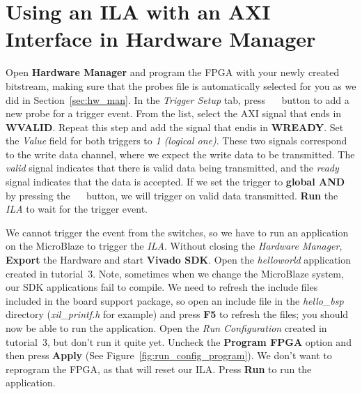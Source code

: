 \documentclass[11pt]{article}
\begin{document}
\section{Using an ILA with an AXI Interface in Hardware Manager}
\label{sec:hw_man2}
Open \textbf{Hardware Manager} and program the FPGA with your newly created bitstream, making sure that the probes file is automatically selected for you as we did in Section~\ref{sec:hw_man}. In the \textit{Trigger Setup} tab, press
~~
button to add a new probe for a trigger event. From the list, select the AXI signal that ends in \textbf{WVALID}. Repeat this step and add the signal that endis in \textbf{WREADY}. Set the \textit{Value} field for both triggers to \textit{1 (logical one)}. These two signals correspond to the write data channel, where we expect the write data to be transmitted. The \textit{valid} signal indicates that there is valid data being transmitted, and the \textit{ready} signal indicates that the data is accepted. If we set the trigger to \textbf{global AND} by pressing the 
~~
button, we will trigger on valid data transmitted. \textbf{Run} the \textit{ILA} to wait for  the trigger event.

We cannot trigger the event from the switches, so we have to run an application on the MicroBlaze to trigger the \textit{ILA}. Without closing the \textit{Hardware Manager}, \textbf{Export} the Hardware and start \textbf{Vivado SDK}. Open the \textit{helloworld} application created in tutorial~3. Note, sometimes when we change the MicroBlaze system, our SDK applications fail to compile. We need to refresh the include files included in the board support package, so open an include file in the \textit{hello\_bsp} directory (\textit{xil\_printf.h} for example) and press \textbf{F5} to refresh the files; you should now be able to run the application. Open the \textit{Run Configuration} created in tutorial~3, but don't run it quite yet. Uncheck the \textbf{Program FPGA} option and then press \textbf{Apply} (See Figure~\ref{fig:run_config_program}). We don't want to reprogram the FPGA, as that will reset our ILA. Press \textbf{Run} to run the application.
\end{document}
